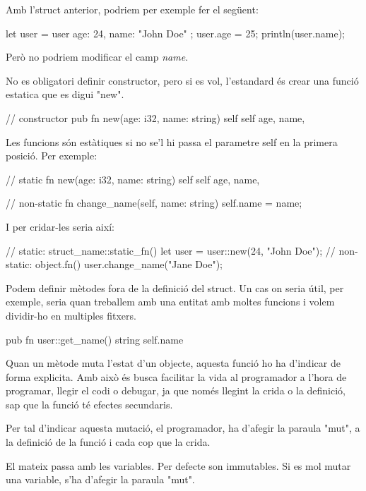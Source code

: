 ﻿\documentclass{article}
\begin{document}
Amb l'struct anterior, podriem per exemple fer el següent:

\begin{code}
let user = user { age: 24, name: "John Doe" };
user.age = 25;
println(user.name);
\end{code}

Però no podriem modificar el camp \textit{name}.

No es obligatori definir constructor, pero si es vol, l'estandard és crear una
funció estatica que es digui "new".

\begin{code}
// constructor
pub fn new(age: i32, name: string) self {
    self {
        age,
        name,
    }
}
\end{code}

Les funcions són estàtiques si no se'l hi passa el parametre self en la primera
posició. Per exemple:

\begin{code}
// static
fn new(age: i32, name: string) self {
    self {
        age,
        name,
    }
}

// non-static
fn change_name(self, name: string) {
    self.name = name;
}
\end{code}

I per cridar-les seria així:

\begin{code}
// static: struct_name::static_fn()
let user = user::new(24, "John Doe");
// non-static: object.fn()
user.change_name("Jane Doe");
\end{code}

Podem definir mètodes fora de la definició del struct. Un cas on seria útil,
per exemple, seria quan treballem amb una entitat amb moltes funcions i volem 
dividir-ho en multiples fitxers.

\begin{code}
pub fn user::get_name() string {
    self.name
}
\end{code}

Quan un mètode muta l'estat d'un objecte, aquesta funció ho ha d'indicar de forma
explicita. Amb això és busca facilitar la vida al programador a l'hora de programar, 
llegir el codi o debugar, ja que només llegint la crida o la definició, sap que
la funció té efectes secundaris.

Per tal d'indicar aquesta mutació, el programador, ha d'afegir la paraula "mut",
a la definició de la funció i cada cop que la crida. 

El mateix passa amb les variables. Per defecte son immutables. Si es mol mutar 
una variable, s'ha d'afegir la paraula "mut".
\end{document}
